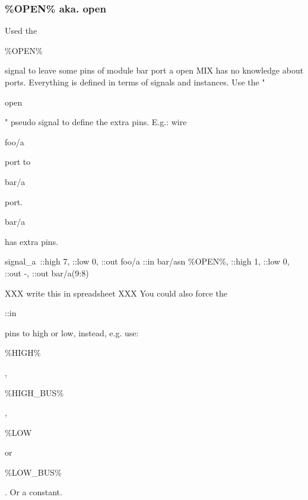 \documentclass[a4paper,12pt]{article}
\begin{document}
\subsubsection{\%OPEN\% aka. open}
Used the \begin{tt}\%OPEN\%\end{tt} signal to leave some pins of module bar port a open MIX has no knowledge about ports. Everything is defined in terms of signals and instances. Use the "\begin{tt}open\end{tt}" pseudo signal to define the extra pins.\newline
\newline
E.g.: wire \begin{tt}foo/a\end{tt} port to \begin{tt}bar/a\end{tt} port. \begin{tt}bar/a\end{tt} has extra pins.\newline
\newline
\begin{tt}signal\_a\, ::high 7, ::low 0, ::out foo/a ::in bar/asn\newline
\%OPEN\%, ::high 1, ::low 0, ::out -, ::out bar/a(9:8)\end{tt}\newline
\newline
XXX write this in spreadsheet XXX\newline
You could also force the \begin{tt}::in\end{tt} pins to high or low, instead, e.g. use:
\newline\begin{tt}\%HIGH\%\end{tt}, \begin{tt}\%HIGH\_BUS\%\end{tt}, \begin{tt}\%LOW\end{tt} or \begin{tt}\%LOW\_BUS\%\end{tt}. Or a constant.
\end{document}
